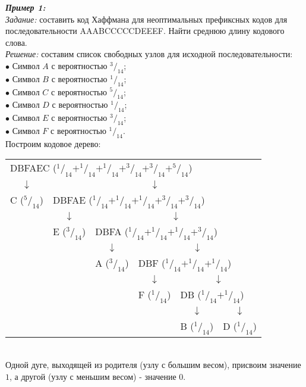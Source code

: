 \emph{\textbf{Пример 1:}}
\\\emph{Задание:} составить код Хаффмана для неоптимальных префиксных кодов для последовательности AAABCCCCCDEEEF. Найти среднюю длину кодового слова.
\\\emph{Решение:} составим список свободных узлов для исходной последовательности:
\\$\bullet$ Символ $A$ с вероятностью $^3/_{14}$;
\\$\bullet$ Символ $B$ с вероятностью $^1/_{14}$;
\\$\bullet$ Символ $C$ с вероятностью $^5/_{14}$;
\\$\bullet$ Символ $D$ с вероятностью $^1/_{14}$;
\\$\bullet$ Символ $E$ с вероятностью $^3/_{14}$;
\\$\bullet$ Символ $F$ с вероятностью $^1/_{14}$.
\\Построим кодовое дерево:
\begin{table}[h]
\centering
\begin{tabular}{c c c c c c}
\multicolumn{6}{l}{DBFAEC ($^1/_{14} + ^1/_{14} + ^1/_{14} + ^3/_{14} + ^3/_{14} + ^5/_{14}$)} \\
$\downarrow$ & \multicolumn{5}{c}{$\downarrow$} \\
C ($^5/_{14}$) & \multicolumn{5}{l}{DBFAE ($^1/_{14} + ^1/_{14} + ^1/_{14} + ^3/_{14} + ^3/_{14}$)} \\
& $\downarrow$ & \multicolumn{4}{c}{$\downarrow$} \\
& E ($^3/_{14}$) & \multicolumn{4}{l}{DBFA ($^1/_{14} + ^1/_{14} + ^1/_{14} + ^3/_{14}$)} \\
& & $\downarrow$ & \multicolumn{3}{c}{$\downarrow$} \\
& & A ($^3/_{14}$) & \multicolumn{3}{l}{DBF ($^1/_{14} + ^1/_{14} + ^1/_{14}$)} \\
& & & $\downarrow$ & \multicolumn{2}{c}{$\downarrow$} \\
& & & F ($^1/_{14}$) & \multicolumn{2}{l}{DB ($^1/_{14} + ^1/_{14}$)} \\
& & & & $\downarrow$ & $\downarrow$ \\
& & & & B ($^1/_{14}$) & D ($^1/_{14}$) \\
\end{tabular}
\end{table}
\\Одной дуге, выходящей из родителя (узлу с большим весом), присвоим значение $1$, а другой (узлу с меньшим весом) - значение $0$.
